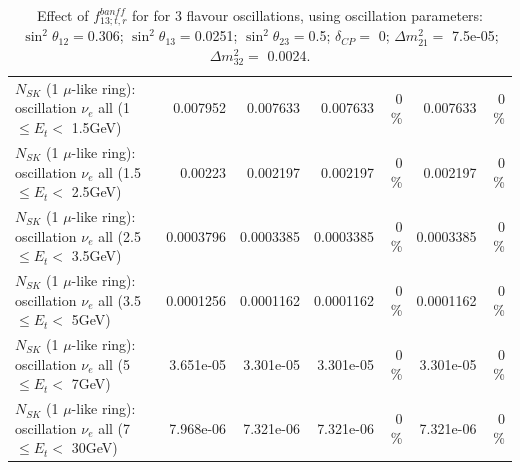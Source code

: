\begin{table}
\begin{tabular}{| l | r | r | r  r | r  r |}
$N_{SK}$ (1 $\mu$-like ring): oscillation $\nu_{e}$ all (1 $\leq E_{t} <$ 1.5GeV) &        0.007952 &        0.007633 &        0.007633 &        0 \%  &        0.007633 &        0 \%  \\ 
$N_{SK}$ (1 $\mu$-like ring): oscillation $\nu_{e}$ all (1.5 $\leq E_{t} <$ 2.5GeV) &         0.00223 &        0.002197 &        0.002197 &        0 \%  &        0.002197 &        0 \%  \\ 
$N_{SK}$ (1 $\mu$-like ring): oscillation $\nu_{e}$ all (2.5 $\leq E_{t} <$ 3.5GeV) &       0.0003796 &       0.0003385 &       0.0003385 &        0 \%  &       0.0003385 &        0 \%  \\ 
$N_{SK}$ (1 $\mu$-like ring): oscillation $\nu_{e}$ all (3.5 $\leq E_{t} <$ 5GeV) &       0.0001256 &       0.0001162 &       0.0001162 &        0 \%  &       0.0001162 &        0 \%  \\ 
 $N_{SK}$ (1 $\mu$-like ring): oscillation $\nu_{e}$ all (5 $\leq E_{t} <$ 7GeV) &       3.651e-05 &       3.301e-05 &       3.301e-05 &        0 \%  &       3.301e-05 &        0 \%  \\ 
$N_{SK}$ (1 $\mu$-like ring): oscillation $\nu_{e}$ all (7 $\leq E_{t} <$ 30GeV) &       7.968e-06 &       7.321e-06 &       7.321e-06 &        0 \%  &       7.321e-06 &        0 \%  \\ 
\hline
\hline
\end{tabular}
\caption{ Effect of $f_{13; t, r}^{banff}$ for for 3 flavour oscillations, using oscillation parameters:  $\sin^2\theta_{12} = $0.306; $\sin^2\theta_{13} = $0.0251; $\sin^2\theta_{23} = $0.5; $\delta_{CP} = $        0; $\Delta m^2_{21} = $    7.5e-05; $\Delta m^2_{32} = $    0.0024. }
\label{tab:num_banff_13_1RmuT_3f_osc_t13:0.0251}
\end{table}
\clearpage
